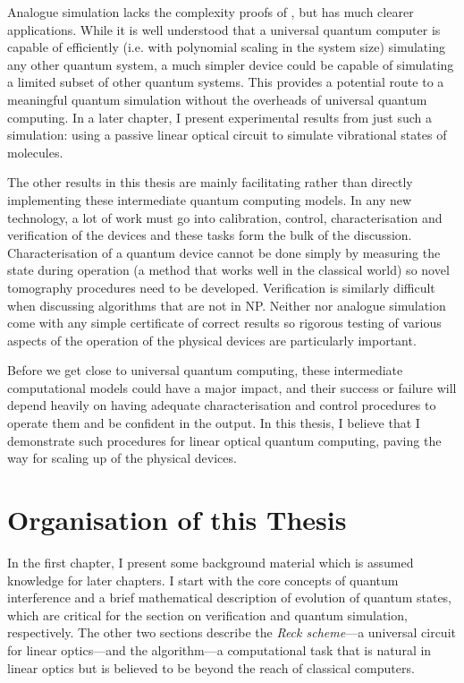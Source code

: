 Analogue simulation lacks the complexity proofs of \bosonsampling{}, but has
much clearer applications. While it is well understood that a universal quantum
computer is capable of efficiently (i.e. with polynomial scaling in the system
size) simulating any other quantum system, a much simpler device could be
capable of simulating a limited subset of other quantum systems. This provides a
potential route to a meaningful quantum simulation without the overheads of
universal quantum computing. In a later chapter, I present experimental results
from just such a simulation: using a passive linear optical circuit to simulate
vibrational states of molecules.

The other results in this thesis are mainly facilitating rather than directly
implementing these intermediate quantum computing models. In any new technology,
a lot of work must go into calibration, control, characterisation and
verification of the devices and these tasks form the bulk of the discussion.
Characterisation of a quantum device cannot be done simply by measuring the
state during operation (a method that works well in the classical world) so
novel tomography procedures need to be developed. Verification is similarly
difficult when discussing algorithms that are not in NP. Neither
\bosonsampling{} nor analogue simulation come with any simple certificate of
correct results so rigorous testing of various aspects of the operation of the
physical devices are particularly important.

Before we get close to universal quantum computing, these intermediate
computational models could have a major impact, and their success or failure
will depend heavily on having adequate characterisation and control procedures
to operate them and be confident in the output. In this thesis, I believe that I
demonstrate such procedures for linear optical quantum computing, paving the way
for scaling up of the physical devices.

\section{Organisation of this Thesis}
\label{sec:Organisation}
In the first chapter, I present some background material which is assumed
knowledge for later chapters. I start with the core concepts of quantum
interference and a brief mathematical description of evolution of quantum
states, which are critical for the section on verification and quantum
simulation, respectively. The other two sections describe the \emph{Reck
scheme}---a universal circuit for linear optics---and the \bosonsampling
algorithm---a computational task that is natural in linear optics but is
believed to be beyond the reach of classical computers.

